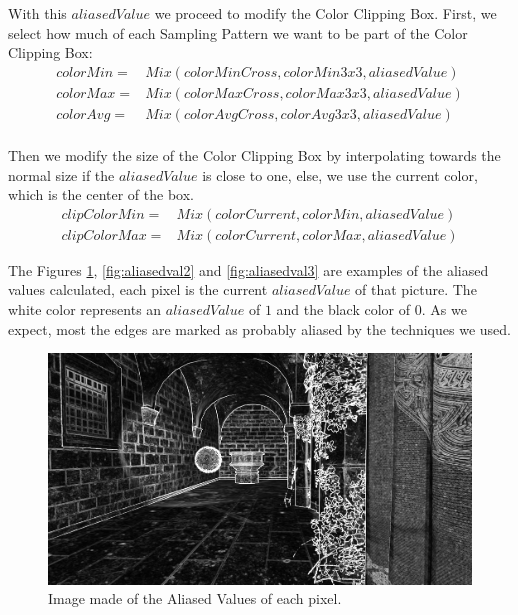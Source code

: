 \documentclass{cslthse-msc}
\begin{document}
With this $aliasedValue$ we proceed to modify the Color Clipping Box. First, we select how much of each Sampling Pattern we want to be part of the Color Clipping Box:
\begin{equation}\label{eq:newcolors}
\begin{split}
colorMin= & Mix(colorMinCross,colorMin3x3,aliasedValue) \\
colorMax= & Mix(colorMaxCross,colorMax3x3,aliasedValue) \\
colorAvg= & Mix(colorAvgCross,colorAvg3x3,aliasedValue) \\
\end{split}
\end{equation}

Then we modify the size of the Color Clipping Box by interpolating towards the normal size if the $aliasedValue$ is close to one, else, we use the current color, which is the center of the box.
\begin{equation}\label{eq:clipredux}
\begin{split}
	clipColorMin= & Mix(colorCurrent,colorMin,aliasedValue) \\
	clipColorMax= & Mix(colorCurrent,colorMax,aliasedValue)
\end{split}
\end{equation}



The Figures \ref{fig:aliasedval1}, \ref{fig:aliasedval2} and \ref{fig:aliasedval3} are examples of the aliased values calculated, each pixel is the current $aliasedValue$ of that picture. The white color represents an $aliasedValue$ of $1$ and the black color of $0$. As we expect, most the edges are marked as probably aliased by the techniques we used.

\begin{figure}[H]
	\centering
	\includegraphics[scale=0.2]{images/aliased_value_example_1_temporal.png}
	\caption{Image made of the Aliased Values of each pixel.}\label{fig:aliasedval1}
\end{figure}
\end{document}
